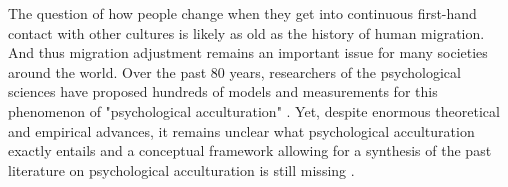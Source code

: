 \documentclass[man, 12pt, a4paper, mask]{apa7}
\begin{document}
%
%
%


The question of how people change when they get into continuous first-hand contact with other cultures is likely as old as the history of human migration. And thus migration adjustment remains an important issue for many societies around the world. 
Over the past 80 years, researchers of the psychological sciences have proposed hundreds of models and measurements for this phenomenon of "psychological acculturation" \citep[][]{Rudmin2003a}. Yet, despite enormous theoretical and empirical advances, it remains unclear what psychological acculturation exactly entails and a conceptual framework allowing for a synthesis of the past literature on psychological acculturation is still missing \citep{Birman2014c}.
\end{document}
